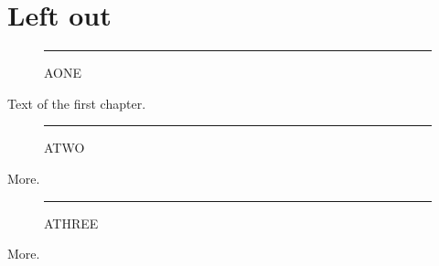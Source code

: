 \chapter{Left out}
\begin{figure}[h]\centering\rule{2cm}{5mm}\caption{AONE}\end{figure}
Text of the first chapter.
\clearpage
\begin{figure}[h]\centering\rule{2cm}{5mm}\caption{ATWO}\end{figure}
More.
\clearpage
\begin{figure}[h]\centering\rule{2cm}{5mm}\caption{ATHREE}\end{figure}
More.
